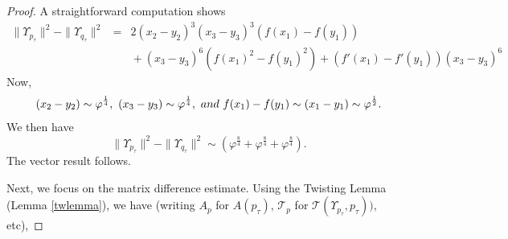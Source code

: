 \documentclass[10pt,a4paper]{amsart}
\begin{document}
\begin{proof}
A straightforward computation shows 
\begin{eqnarray*}
\|\Upsilon_{p_\tau}\|^2-\|\Upsilon_{q_\tau}\|^2 & = & 2(x_2-y_2)^3(x_3-y_3)^3(f(x_1)-f(y_1)) \\ 
& & \mbox{}+(x_3-y_3)^6(f(x_1)^2-f(y_1)^2)+(f'(x_1)-f'(y_1))(x_3-y_3)^6
\end{eqnarray*}
Now, \begin{equation*}
(x_2-y_2) \sim  \varphi^\frac{1}{4},\
(x_3-y_3)  \sim  \varphi^\frac{1}{4},\ \textmd{and\ }
f(x_1)-f(y_1)  \sim  (x_1-y_1)\sim\varphi^\frac{1}{2}.
\end{equation*}
We then have 
\[\|\Upsilon_{p_\tau}\|^2-\|\Upsilon_{q_\tau}\|^2\sim (\varphi^\frac{8}{4}+\varphi^\frac{8}{4}+\varphi^\frac{8}{4}).\]
The vector result follows. 

Next, we focus on the matrix difference estimate.  Using the Twisting Lemma (Lemma \ref{twlemma}), we have (writing $A_p$ for $A(p_\tau)$, $\mathcal{T}_p$ for $\mathcal{T}(\Upsilon_{p_\tau},p_\tau))$, etc),


\end{proof}
\end{document}
